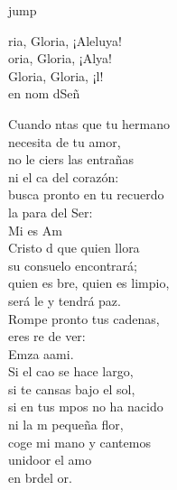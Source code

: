 \begin{cancion}jump\\
	\begin{chorus}%
		ria, Gloria, ¡Aleluya!\\
		oria, Gloria, ¡Alya!\\
		Gloria, Gloria, ¡l!\\
		en nom dSeñ \jump\\
	\end{chorus}%
	Cuando ntas que tu hermano\\
	\jump
necesita de tu amor,\\
	no le ciers las entrañas\\
	ni el ca del corazón:\\
	\jump
busca pronto en tu recuerdo\\
	la para del Ser:\\
	Mi  es  Am\\
	\jump
	Cristo d que quien llora\\
	\jump
su consuelo encontrará;\\
	quien es bre, quien es limpio,\\
	será le y tendrá paz.\\
	\jump
Rompe pronto tus cadenas,\\
	eres re de ver:\\
	Emza aami.\\
	\jump
	Si el cao se hace largo,\\
	\jump
si te cansas bajo el sol,\\
	si en tus mpos no ha nacido\\
	ni la m pequeña flor,\\
	\jump
coge mi mano y cantemos\\
	unidoor el amo\\
	en brdel or. \\
\end{cancion}%

